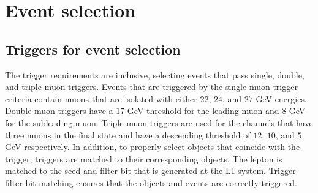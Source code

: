 \section{Event selection}
\label{sec:selection}

\subsection{Triggers for event selection}
\label{sec:trig}
The trigger requirements are inclusive, selecting events that pass single, double, and triple muon triggers. Events that are triggered by the single muon trigger criteria contain muons that are isolated with either $22$, $24$, and $27$ GeV energies. Double muon triggers have a $17$ GeV threshold for the leading muon and $8$ GeV for the subleading muon. Triple muon triggers are used for the channels that have three muons in the final state and have a descending threshold of $12$, $10$, and $5$ GeV respectively. In addition, to properly select objects that coincide with the trigger, triggers are matched to their corresponding objects. The lepton is matched to the seed and filter bit that is generated at the L1 system. Trigger filter bit matching ensures that the objects and events are correctly triggered. 

